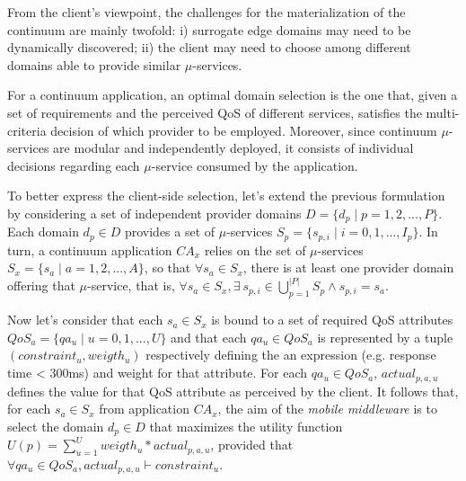 
From the client's viewpoint, the challenges for the materialization of the continuum are mainly twofold: i) surrogate edge domains may need to be dynamically discovered; ii) the client may need to choose among different domains able to provide similar $\mu$-services.

For a continuum application, an optimal domain selection is the one that, given a set of requirements and the perceived QoS of different services, satisfies the multi-criteria decision of which provider to be employed. Moreover, since continuum $\mu$-services are modular and independently deployed, it consists of individual decisions regarding each $\mu$-service consumed by the application.

To better express the client-side selection, let's extend the previous formulation by considering a set of independent provider domains $D = \{d_p \mid p = 1,2,...,P\}$. Each domain $d_p \in D$ provides a set of $\mu$-services $S_{p} = \{s_{p,i} \mid i =  0, 1, ..., I_p\}$. In turn, a continuum application $CA_x$ relies on the set of $\mu$-services $S_x = \{s_a \mid a = 1,2,...,A\}$, so that $\forall s_a \in S_x$, there is at least one provider domain offering that $\mu$-service, that is, $\forall s_a \in S_x, \exists\ s_{p,i} \in \bigcup_{p=1}^{|P|} S_p \wedge s_{p,i} = s_a$. 

Now let's consider that each $s_a \in S_x$ is bound to a set of required QoS attributes $QoS_a = \{qa_u \mid u = 0, 1, ..., U\}$ and that each $qa_u \in QoS_a$ is represented by a tuple $(constraint_u, weigth_u)$ respectively defining the an expression (e.g. response time < 300ms) and weight for that attribute. For each $qa_u \in QoS_a$, $actual_{p,a,u}$ defines the value for that QoS attribute as perceived by the client. It follows that, for each $s_a \in S_x$ from application $CA_x$, the aim of the \textit{mobile middleware} is to select the domain $d_p \in D$ 
that maximizes the utility function $U(p) = \sum_{u=1}^{U} weigth_u * actual_{p,a,u}$, provided that $\forall qa_u \in QoS_a, actual_{p,a,u} \vdash constraint_u$.



